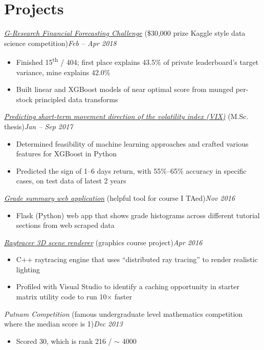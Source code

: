 \documentclass[10pt,letterpaper]{article}
\newcommand*\position[1]{\textit{#1}}
\newcommand*\timespan\position
\begin{document}
\section*{Projects}
\position{\href{https://financialforecasting.gresearch.co.uk/}{G-Research Financial Forecasting Challenge}} (\$30,000 prize Kaggle style data science competition)\hfill\timespan{Feb -- Apr 2018}
\begin{itemize}
\item Finished 15\textsuperscript{th} / 404; first place explains 43.5\% of private leaderboard's target variance, mine explains 42.0\%
\item Built linear and XGBoost models of near optimal score from munged per-stock principled data transforms
\end{itemize}
\position{\href{https://tspace.library.utoronto.ca/bitstream/1807/79328/3/Yu_Michael_Y_201711_MSc_thesis.pdf}{Predicting short-term movement direction of the volatility index (VIX)}} (M.Sc. thesis)\hfill\timespan{Jan -- Sep 2017}
\begin{itemize}
\item Determined feasibility of machine learning approaches and crafted various features for XGBoost in Python
\item Predicted the sign of 1--6 days return, with 55\%--65\% accuracy in specific cases, on test data of latest 2 years
\end{itemize}
\position{\href{https://github.com/yumichael/blackboardlearn-statsview}{Grade summary web application}} (helpful tool for course I TAed)\hfill\timespan{Nov 2016}
\begin{itemize}
\item Flask (Python) web app that shows grade histograms across different tutorial sections from web scraped data
\end{itemize}
\position{\href{https://github.com/yumichael/raytrace}{Raytracer 3D scene renderer}} (graphics course project)\hfill\timespan{Apr 2016}
\begin{itemize}
\item C++ raytracing engine that uses ``distributed ray tracing'' to render realistic lighting
\item Profiled with Visual Studio to identify a caching opportunity in starter matrix utility code to run 10\(\times\) faster
\end{itemize}
\position{Putnam Competition} (famous undergraduate level mathematics competition where the median score is 1)\hfill\timespan{Dec 2013}
\begin{itemize}
\item Scored 30, which is rank 216 / \(\sim\) 4000
\end{itemize}
\end{document}
